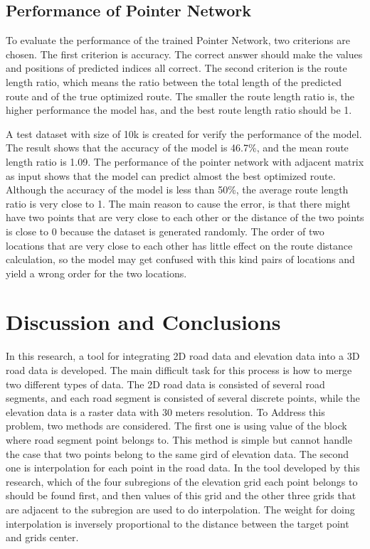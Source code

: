 \documentclass[final-report]{report-template}
\begin{document}
\subsection{Performance of Pointer Network}
To evaluate the performance of the trained Pointer Network, two criterions are chosen. 
The first criterion is accuracy. 
The correct answer should make the values and positions of predicted indices all correct.
The second criterion is the route length ratio, 
which means the ratio between the total length of the predicted route and of the true optimized route.
The smaller the route length ratio is, the higher performance the model has, 
and the best route length ratio should be 1.

A test dataset with size of 10k is created for verify the performance of the model. 
The result shows that the accuracy of the model is 46.7\%,
and the mean route length ratio is 1.09.
The performance of the pointer network with adjacent matrix as input shows that 
the model can predict almost the best optimized route. 
Although the accuracy of the model is less than 50\%, the average route length ratio is very close to 1.
The main reason to cause the error, is that there might have two points that are very close to each other 
or the distance of the two points is close to 0 because the dataset is generated randomly.
The order of two locations that are very close to each other has little effect on the route distance calculation, 
so the model may get confused with this kind pairs of locations and yield a wrong order for the two locations.

\section {Discussion and Conclusions}
In this research, a tool for integrating 2D road data and elevation data into a 3D road data is developed.
The main difficult task for this process is how to merge two different types of data.
The 2D road data is consisted of several road segments, and each road segment is consisted of several discrete points, 
while the elevation data is a raster data with 30 meters resolution. 
To Address this problem, two methods are considered. 
The first one is using value of the block where road segment point belongs to. 
This method is simple but cannot handle the case that two points belong to the same gird of elevation data.
The second one is interpolation for each point in the road data. In the tool developed by this research, 
which of the four subregions of the elevation grid each point belongs to should be found first, 
and then values of this grid and the other three grids that are adjacent to the subregion are used to do interpolation.
The weight for doing interpolation is inversely proportional to the distance between the target point and grids center.
\end{document}
